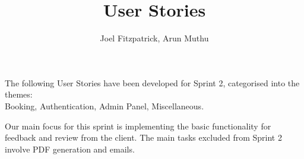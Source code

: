 \documentclass[a4paper, 10pt]{article}
\title{User Stories}
\author{Joel Fitzpatrick, Arun Muthu}
\begin{document}
\setlength{\headsep}{0pt}

\maketitle

\noindent
The following User Stories have been developed for Sprint 2, categorised into the themes: \\
Booking, Authentication, Admin Panel, Miscellaneous.\vspace{\baselineskip}

\noindent
Our main focus for this sprint is implementing the basic functionality for feedback and review from the client. 
The main tasks excluded from Sprint 2 involve PDF generation and emails.

\vspace*{1em}
\end{document}
